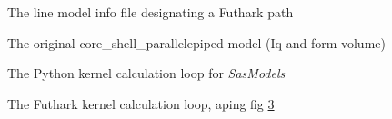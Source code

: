 \documentclass[11pt]{article}
\newcommand{\sasmodels}{\textit{SasModels}}
\begin{document}
\begin{figure}
  
  \label{fig:linemodelinfo-futhark}
  \caption{The line model info file designating a Futhark path}
\end{figure}

\begin{figure}
  
  
  \label{fig:core_shell}
  \caption{The original core\_shell\_parallelepiped model (Iq and form volume)}
\end{figure}

\begin{figure}
  
  \label{fig:kernelpy_loop}
  \caption{The Python kernel calculation loop for \sasmodels}
\end{figure}

\begin{figure}
  
  \label{fig:kernelfut_loop}
  \caption{The Futhark kernel calculation loop, aping fig \ref{fig:kernelpy_loop}}
\end{figure}
\end{document}
